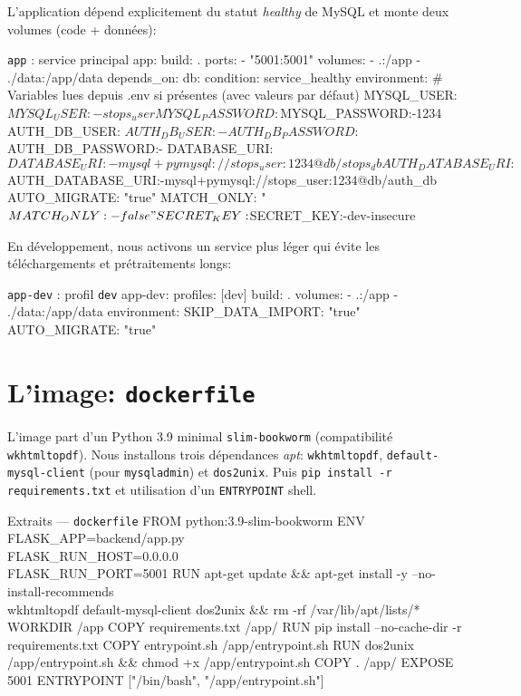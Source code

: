 \noindent L'application dépend explicitement du statut \textit{healthy} de MySQL et monte deux volumes (code + données):

\begin{codebox}[language=yaml]{\texttt{app} : service principal}
  app:
    build: .
    ports:
      - "5001:5001"
    volumes:
      - .:/app
      - ./data:/app/data
    depends_on:
      db:
        condition: service_healthy
    environment:
      # Variables lues depuis .env si présentes (avec valeurs par défaut)
      MYSQL_USER: ${MYSQL_USER:-stops_user}
      MYSQL_PASSWORD: ${MYSQL_PASSWORD:-1234}
      AUTH_DB_USER: ${AUTH_DB_USER:-}
      AUTH_DB_PASSWORD: ${AUTH_DB_PASSWORD:-}
      DATABASE_URI: ${DATABASE_URI:-mysql+pymysql://stops_user:1234@db/stops_db}
      AUTH_DATABASE_URI: ${AUTH_DATABASE_URI:-mysql+pymysql://stops_user:1234@db/auth_db}
      AUTO_MIGRATE: "true"
      MATCH_ONLY: "${MATCH_ONLY:-false}"
      SECRET_KEY: ${SECRET_KEY:-dev-insecure}
\end{codebox}

\noindent En développement, nous activons un service plus léger qui évite les téléchargements et prétraitements longs:

\begin{codebox}[language=yaml]{\texttt{app-dev} : profil \texttt{dev}}
  app-dev:
    profiles: [dev]
    build: .
    volumes:
      - .:/app
      - ./data:/app/data
    environment:
      SKIP_DATA_IMPORT: "true"
      AUTO_MIGRATE: "true"
\end{codebox}

\section{L'image: \texttt{dockerfile}}

L'image part d'un Python 3.9 minimal \texttt{slim-bookworm} (compatibilité \texttt{wkhtmltopdf}). Nous installons trois dépendances \textit{apt}: \texttt{wkhtmltopdf}, \texttt{default-mysql-client} (pour \texttt{mysqladmin}) et \texttt{dos2unix}. Puis \texttt{pip install -r requirements.txt} et utilisation d'un \texttt{ENTRYPOINT} shell.

\begin{codebox}[language=bash]{Extraits — \texttt{dockerfile}}
FROM python:3.9-slim-bookworm
ENV FLASK_APP=backend/app.py \\
    FLASK_RUN_HOST=0.0.0.0 \\
    FLASK_RUN_PORT=5001
RUN apt-get update && apt-get install -y --no-install-recommends \\
    wkhtmltopdf default-mysql-client dos2unix && rm -rf /var/lib/apt/lists/*
WORKDIR /app
COPY requirements.txt /app/
RUN pip install --no-cache-dir -r requirements.txt
COPY entrypoint.sh /app/entrypoint.sh
RUN dos2unix /app/entrypoint.sh && chmod +x /app/entrypoint.sh
COPY . /app/
EXPOSE 5001
ENTRYPOINT ["/bin/bash", "/app/entrypoint.sh"]
\end{codebox}

